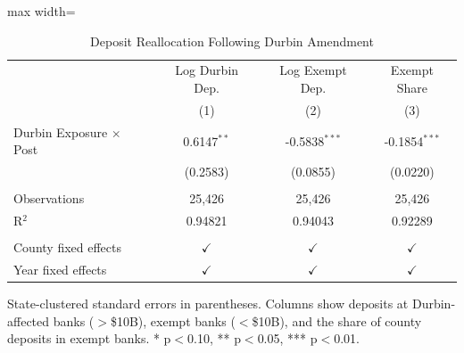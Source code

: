 
\begin{table}[htbp]
   \caption{\label{tab:deposits} Deposit Reallocation Following Durbin Amendment}
   \bigskip
   \centering
   \begin{adjustbox}{max width=\textwidth}
   \begin{tabular}{lccc}
      \toprule
                                  & Log Durbin Dep.         & Log Exempt Dep.         & Exempt Share \\
                                  & (1)                     & (2)                     & (3)\\
      \midrule
      Durbin Exposure $\times$ Post & 0.6147$^{**}$           & -0.5838$^{***}$         & -0.1854$^{***}$\\
                                  & (0.2583)                & (0.0855)                & (0.0220)\\
       \\
      Observations                & 25,426                  & 25,426                  & 25,426\\
      R$^2$                       & 0.94821                 & 0.94043                 & 0.92289\\
       \\
      County fixed effects        & $\checkmark$            & $\checkmark$            & $\checkmark$\\
      Year fixed effects          & $\checkmark$            & $\checkmark$            & $\checkmark$\\
      \bottomrule
   \end{tabular}
   \end{adjustbox}
   
   \par \raggedright 
   State-clustered standard errors in parentheses. Columns show deposits at Durbin-affected banks ($>$\$10B), exempt banks ($<$\$10B), and the share of county deposits in exempt banks. * p$<$0.10, ** p$<$0.05, *** p$<$0.01.
\end{table}


